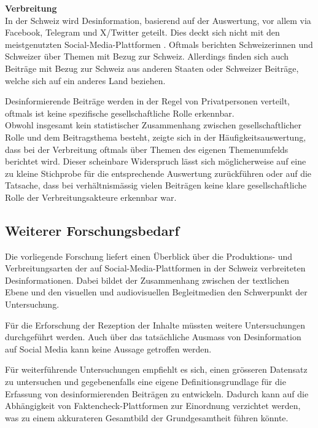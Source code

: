 \documentclass[12pt,a4paper]{article}        %
\begin{document}
\textbf{Verbreitung}\\
In der Schweiz wird Desinformation, basierend auf der Auswertung, vor allem via Facebook, Telegram und X/Twitter geteilt. Dies deckt sich nicht mit den meistgenutzten Social-Media-Plattformen \parencite[vgl.]{we_are_social_fuhrende_2025}.
Oftmals berichten Schweizerinnen und Schweizer über Themen mit Bezug zur Schweiz. Allerdings finden sich auch Beiträge mit Bezug zur Schweiz aus anderen Staaten oder Schweizer Beiträge, welche sich auf ein anderes Land beziehen.

Desinformierende Beiträge werden in der Regel von Privatpersonen verteilt, oftmals ist keine spezifische gesellschaftliche Rolle erkennbar. \\
Obwohl insgesamt kein statistischer Zusammenhang zwischen gesellschaftlicher Rolle und dem Beitragsthema besteht, zeigte sich in der Häufigkeitsauswertung, dass bei der Verbreitung oftmals über Themen des eigenen Themenumfelds berichtet wird. Dieser scheinbare Widerspruch lässt sich möglicherweise auf eine zu kleine Stichprobe für die entsprechende Auswertung zurückführen oder auf die Tatsache, dass bei verhältnismässig vielen Beiträgen keine klare gesellschaftliche Rolle der Verbreitungsakteure erkennbar war.

\subsection{Weiterer Forschungsbedarf}
Die vorliegende Forschung liefert einen Überblick über die Produktions- und Verbreitungsarten der auf Social-Media-Plattformen in der Schweiz verbreiteten Desinformationen. Dabei bildet der Zusammenhang zwischen der textlichen Ebene und den visuellen und audiovisuellen Begleitmedien den Schwerpunkt der Untersuchung.

Für die Erforschung der Rezeption der Inhalte müssten weitere Untersuchungen durchgeführt werden. Auch über das tatsächliche Ausmass von Desinformation auf Social Media kann keine Aussage getroffen werden.

\pagebreak
Für weiterführende Untersuchungen empfiehlt es sich, einen grösseren Datensatz zu untersuchen und gegebenenfalls eine eigene Definitionsgrundlage für die Erfassung von desinformierenden Beiträgen zu entwickeln. Dadurch kann auf die Abhängigkeit von Faktencheck-Plattformen zur Einordnung verzichtet werden, was zu einem akkurateren Gesamtbild der Grundgesamtheit führen könnte.
\pagebreak
\end{document}
